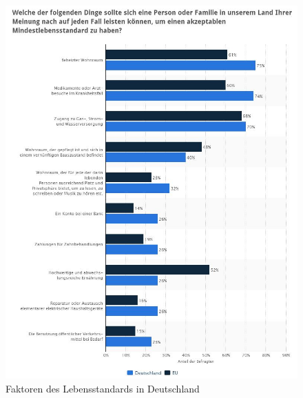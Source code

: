 \begin{figure} [hp]
\centering
\includegraphics[width=0.7\linewidth]{./images/FaktorenLebensstand}
\caption{Faktoren des Lebensstandards in Deutschland \cite{statistaDeLebnst}}
\label{fig:FaktorenLebensstand}
\end{figure}
\newpage
